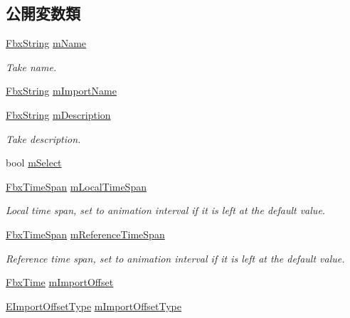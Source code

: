 \subsection*{公開変数類}
\begin{DoxyCompactItemize}
\item 
\hyperlink{class_fbx_string}{Fbx\+String} \hyperlink{class_fbx_take_info_ac505b495f047d57eda55340f699f583e}{m\+Name}
\begin{DoxyCompactList}\small\item\em Take name. \end{DoxyCompactList}\item 
\hyperlink{class_fbx_string}{Fbx\+String} \hyperlink{class_fbx_take_info_ac767c10374a8759594b16aedafae83f9}{m\+Import\+Name}
\item 
\hyperlink{class_fbx_string}{Fbx\+String} \hyperlink{class_fbx_take_info_a1104cb914ad2cf041aa6b9cdd956e739}{m\+Description}
\begin{DoxyCompactList}\small\item\em Take description. \end{DoxyCompactList}\item 
bool \hyperlink{class_fbx_take_info_a0e239e6f052b3d5cbccbeb85669d9a63}{m\+Select}
\item 
\hyperlink{class_fbx_time_span}{Fbx\+Time\+Span} \hyperlink{class_fbx_take_info_a5cbdcdad5fb1b692703784f6d8b6bc51}{m\+Local\+Time\+Span}
\begin{DoxyCompactList}\small\item\em Local time span, set to animation interval if it is left at the default value. \end{DoxyCompactList}\item 
\hyperlink{class_fbx_time_span}{Fbx\+Time\+Span} \hyperlink{class_fbx_take_info_a26d1e723fc0e32e88b38a1aafbdf8665}{m\+Reference\+Time\+Span}
\begin{DoxyCompactList}\small\item\em Reference time span, set to animation interval if it is left at the default value. \end{DoxyCompactList}\item 
\hyperlink{class_fbx_time}{Fbx\+Time} \hyperlink{class_fbx_take_info_a710e53c9ae01db3c19d895aee1d5b6cc}{m\+Import\+Offset}
\item 
\hyperlink{class_fbx_take_info_a64a38a536155104dfa7bc79ffb7ef8dc}{E\+Import\+Offset\+Type} \hyperlink{class_fbx_take_info_a91754fee6b84796e781b532661cfb2bd}{m\+Import\+Offset\+Type}
\item 

\end{DoxyCompactItemize}
